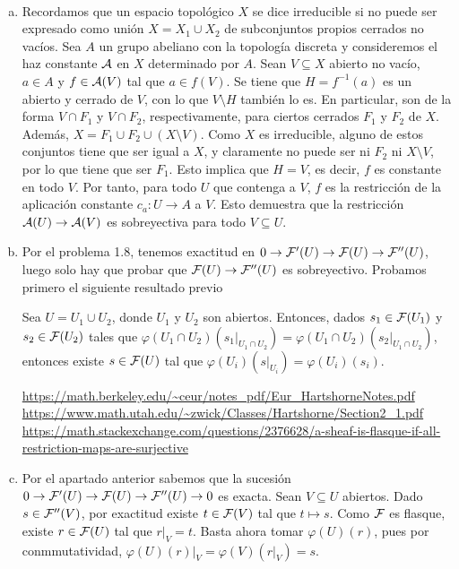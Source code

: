 \documentclass[twoside]{article}
\begin{document}
\begin{solucion}\
\begin{enumerate}[(a)]
\item Recordamos que un espacio topológico $X$ se dice irreducible si no puede ser expresado como unión $X=X_1\cup X_2$ de subconjuntos propios cerrados no vacíos. Sea $A$ un grupo abeliano con la topología discreta y consideremos el haz constante $\mathcal{A}$ en $X$ determinado por $A$. Sean $V\subseteq X$ abierto no vacío, $a\in A$ y $f\in\mathcal{A}(V)$ tal que $a\in f(V)$. Se tiene que $H=f^{-1}(a)$ es un abierto y cerrado de $V$, con lo que $V\setminus H$ también lo es. En particular, son de la forma $V\cap F_1$ y $V\cap F_2$, respectivamente, para ciertos cerrados $F_1$ y $F_2$ de $X$. Además, $X=F_1\cup F_2\cup (X\setminus V)$. Como $X$ es irreducible, alguno de estos conjuntos tiene que ser igual a $X$, y claramente no puede ser ni $F_2$ ni $X\setminus V$, por lo que tiene que ser $F_1$. Esto implica que $H=V$, es decir, $f$ es constante en todo $V$. Por tanto, para todo $U$ que contenga a $V$, $f$ es la restricción de la aplicación constante $c_a:U\to A$ a $V$. Esto demuestra que la restricción $\mathcal{A}(U)\to\mathcal{A}(V)$ es sobreyectiva para todo $V\subseteq U$.

\item Por el problema 1.8, tenemos exactitud en $0\to\mathcal{F}'(U)\to\mathcal{F}(U)\to\mathcal{F}''(U)$, luego solo hay que probar que $\mathcal{F}(U)\to\mathcal{F}''(U)$ es sobreyectivo. Probamos primero el siguiente resultado previo
\begin{lemma}
Sea $U=U_1\cup U_2$, donde $U_1$ y $U_2$ son abiertos. Entonces, dados $s_1\in\mathcal{F}(U_1)$ y $s_2\in\mathcal{F}(U_2)$ tales que $\varphi(U_1\cap U_2)(s_1|_{U_1\cap U_2})=\varphi(U_1\cap U_2)(s_2|_{U_1\cap U_2})$, entonces existe $s\in\mathcal{F}(U)$ tal que $\varphi(U_i)(s|_{U_i})=\varphi(U_i)(s_i)$. 
\end{lemma}
\url{https://math.berkeley.edu/~ceur/notes_pdf/Eur_HartshorneNotes.pdf}
\url{https://www.math.utah.edu/~zwick/Classes/Hartshorne/Section2_1.pdf}
\url{https://math.stackexchange.com/questions/2376628/a-sheaf-is-flasque-if-all-restriction-maps-are-surjective}

\item Por el apartado anterior sabemos que la sucesión $0\to\mathcal{F}'(U)\to\mathcal{F}(U)\to\mathcal{F}''(U)\to 0$ es exacta. Sean $V\subseteq U$ abiertos. Dado $s\in\mathcal{F}''(V)$, por exactitud existe $t\in\mathcal{F}(V)$ tal que $t\mapsto s$. Como $\mathcal{F}$ es flasque, existe $r\in\mathcal{F}(U)$ tal que $r|_V=t$. Basta ahora tomar $\varphi(U)(r)$, pues por conmmutatividad, $\varphi(U)(r)|_V=\varphi(V)(r|_V)=s$. 


\end{enumerate}
\end{solucion}
\end{document}
